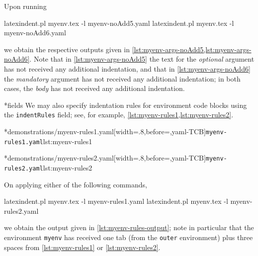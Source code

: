	Upon running
	\begin{commandshell}
latexindent.pl myenv.tex -l myenv-noAdd5.yaml  
latexindent.pl myenv.tex -l myenv-noAdd6.yaml  
\end{commandshell}
	we obtain the respective outputs given in \cref{lst:myenv-args-noAdd5,lst:myenv-args-noAdd6}. Note that in
	\cref{lst:myenv-args-noAdd5} the text for the \emph{optional} argument has not
	received any additional indentation, and that in \cref{lst:myenv-args-noAdd6} the
	\emph{mandatory} argument has not received any additional indentation; in both
	cases, the \emph{body} has not received any additional indentation.

	\begin{minipage}{.45\textwidth}
	\end{minipage}
	\hfill
	\begin{minipage}{.45\textwidth}
	\end{minipage}

*{fields}
	We may also specify indentation rules for environment code blocks using the
	\texttt{indentRules} field; see, for example, \cref{lst:myenv-rules1,lst:myenv-rules2}.

	\begin{minipage}{.45\textwidth}
		\cmhlistingsfromfile[style=yaml-LST]*{demonstrations/myenv-rules1.yaml}[width=.8\linewidth,before=\centering,yaml-TCB]{\texttt{myenv-rules1.yaml}}{lst:myenv-rules1}
	\end{minipage}
	\hfill
	\begin{minipage}{.45\textwidth}
		\cmhlistingsfromfile[style=yaml-LST]*{demonstrations/myenv-rules2.yaml}[width=.8\linewidth,before=\centering,yaml-TCB]{\texttt{myenv-rules2.yaml}}{lst:myenv-rules2}
	\end{minipage}

	On applying either of the following commands,
	\begin{commandshell}
latexindent.pl myenv.tex -l myenv-rules1.yaml  
latexindent.pl myenv.tex -l myenv-rules2.yaml  
\end{commandshell}
	we obtain the output given in \cref{lst:myenv-rules-output}; note in particular that the
	environment \texttt{myenv} has received one tab (from the
	\texttt{outer} environment) plus three spaces from \cref{lst:myenv-rules1} or
	\ref{lst:myenv-rules2}.

